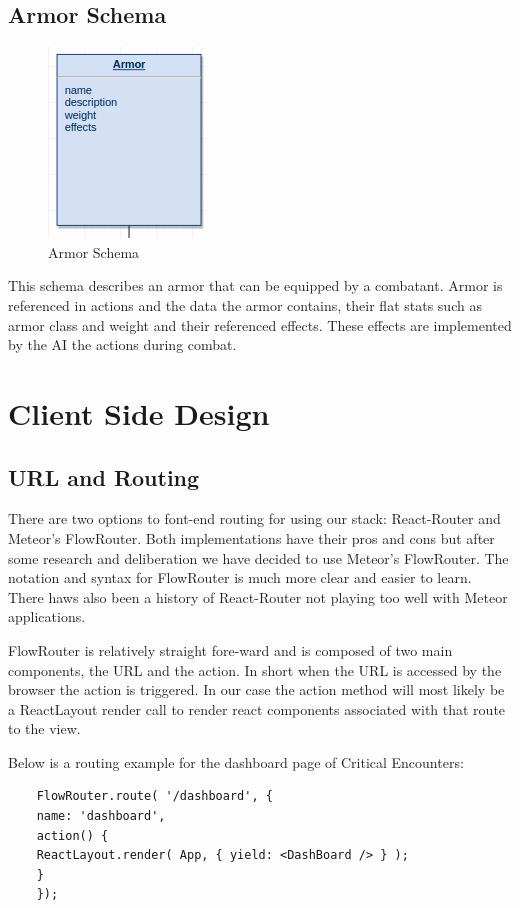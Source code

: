 \documentclass[12pt,a4paper]{report}
\begin{document}
	\subsection {Armor Schema}
	\begin{figure}[H]
		\centering
		\includegraphics[scale=.9]{schema-armor}
		\caption{Armor Schema}
		\label{fig: Armor Schema }
	\end{figure}
	This schema describes an armor that can be equipped by a combatant. Armor is referenced in actions and the data the armor contains, their flat stats such as armor class and weight and their referenced effects. These effects are implemented by the AI the actions during combat.
	\newpage
	\section{Client Side Design}
	
	\subsection{URL and Routing}
	There are two options to font-end routing for using our stack: React-Router and Meteor's FlowRouter. Both implementations have their pros and cons but after some research and deliberation we have decided to use Meteor's FlowRouter. The notation and syntax for FlowRouter is much more clear and easier to learn. There haws also been a history of React-Router not playing too well with Meteor applications. 
	
	FlowRouter is relatively straight fore-ward and is composed of two main components, the URL and the action. In short when the URL is accessed by the browser the action is triggered. In our case the action method will most likely be a ReactLayout render call to render react components associated with that route to the view.
	
	Below is a routing example for the dashboard page of Critical Encounters:
	
	\begin{lstlisting}
	FlowRouter.route( '/dashboard', {
	name: 'dashboard',
	action() {
	ReactLayout.render( App, { yield: <DashBoard /> } );
	}
	});
	\end{lstlisting}
	
\end{document}
